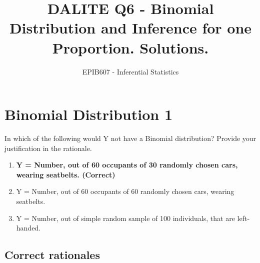 \documentclass[letterpaper,9pt,twoside,printwatermark=false]{pinp}
\title{DALITE Q6 - Binomial Distribution and Inference for one Proportion.
Solutions.}
\author[a]{EPIB607 - Inferential Statistics}
\affil[a]{Fall 2018, McGill University}
\providecommand{\tightlist}{%
  \setlength{\itemsep}{0pt}\setlength{\parskip}{0pt}}
\begin{document}
\verticaladjustment{-2pt}

\maketitle
\thispagestyle{firststyle}



\section{Binomial Distribution 1}\label{binomial-distribution-1}

In which of the following would Y not have a Binomial distribution?
Provide your justification in the rationale.

\begin{enumerate}
\def\labelenumi{\alph{enumi}.}
\tightlist
\item
  \textbf{Y = Number, out of 60 occupants of 30 randomly chosen cars,
  wearing seatbelts. (Correct)}
\item
  Y = Number, out of 60 occupants of 60 randomly chosen cars, wearing
  seatbelts.
\item
  Y = Number, out of simple random sample of 100 individuals, that are
  left-handed.
\end{enumerate}

\subsection{Correct rationales}\label{correct-rationales}
\end{document}
